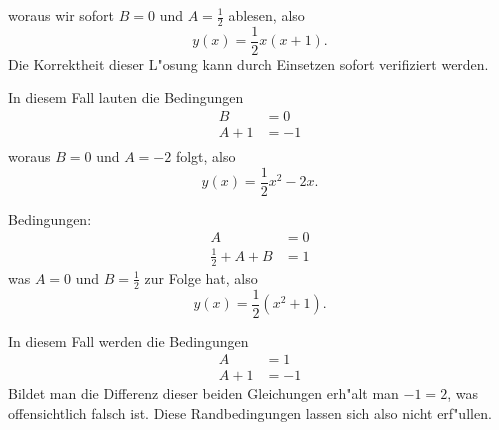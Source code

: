 {\begin{loesung}
\begin{teilaufgaben}
woraus wir sofort $B=0$ und $A=\frac12$ ablesen, also
\[
y(x)=\frac12x(x+1).
\]
Die Korrektheit dieser L"osung kann durch Einsetzen sofort
verifiziert werden.
\item In diesem Fall lauten die Bedingungen
\begin{align*}
B&=0\\
A+1&=-1\\
\end{align*}
woraus $B=0$ und $A=-2$ folgt, also
\[
y(x)=\frac12x^2-2x.
\]
\item
Bedingungen:
\begin{align*}
A&=0\\
\frac12+A+B&=1
\end{align*}
was $A=0$ und $B=\frac12$ zur Folge hat, also
\[
y(x)=\frac12(x^2+1).
\]
\item In diesem Fall werden die Bedingungen
\begin{align*}
A&=1\\
A+1&=-1
\end{align*}
Bildet man die Differenz dieser beiden Gleichungen
erh"alt man $-1=2$, was offensichtlich falsch ist. Diese
Randbedingungen lassen sich also nicht erf"ullen.
\end{teilaufgaben}
\end{loesung}
}{}

